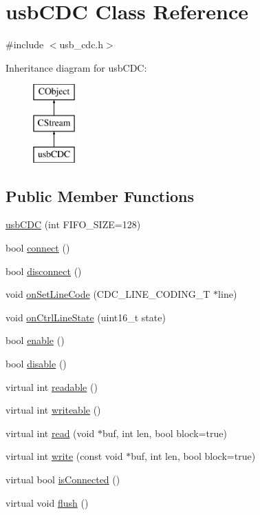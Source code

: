 \hypertarget{classusb_c_d_c}{\section{usb\-C\-D\-C Class Reference}
\label{classusb_c_d_c}
}


{\ttfamily \#include $<$usb\-\_\-cdc.\-h$>$}

Inheritance diagram for usb\-C\-D\-C\-:\begin{figure}[H]
\begin{center}
\leavevmode
\includegraphics[height=3.000000cm]{d6/dc5/classusb_c_d_c}
\end{center}
\end{figure}
\subsection*{Public Member Functions}
\begin{DoxyCompactItemize}
\item 
\hyperlink{classusb_c_d_c_a6eb4d9401ac17bab0bfb869bf6fc6315}{usb\-C\-D\-C} (int F\-I\-F\-O\-\_\-\-S\-I\-Z\-E=128)
\item 
bool \hyperlink{classusb_c_d_c_a49d431de50da7ccacf91ef33b04e99d2}{connect} ()
\item 
bool \hyperlink{classusb_c_d_c_aa95f819926a8da40f12eebc62adf6f95}{disconnect} ()
\item 
void \hyperlink{classusb_c_d_c_a15d235836f03a59a8d3a12ad5df78cd7}{on\-Set\-Line\-Code} (C\-D\-C\-\_\-\-L\-I\-N\-E\-\_\-\-C\-O\-D\-I\-N\-G\-\_\-\-T $\ast$line)
\item 
void \hyperlink{classusb_c_d_c_ad20e467624da633a79b150a435667619}{on\-Ctrl\-Line\-State} (uint16\-\_\-t state)
\item 
bool \hyperlink{classusb_c_d_c_a806fa3a4be9e6cfaab51b8621cb70697}{enable} ()
\item 
bool \hyperlink{classusb_c_d_c_a7ded774547bd49ca5f73257914a1f1f9}{disable} ()
\item 
virtual int \hyperlink{classusb_c_d_c_a7182c4dfdad0293bba73a82056d43e80}{readable} ()
\item 
virtual int \hyperlink{classusb_c_d_c_ae45acb09392fedde912a5dba6fc3b88a}{writeable} ()
\item 
virtual int \hyperlink{classusb_c_d_c_a65831ad4bfa85bf83f467c63b9f22799}{read} (void $\ast$buf, int len, bool block=true)
\item 
virtual int \hyperlink{classusb_c_d_c_a340c728ca722a61a3a457a546a301dec}{write} (const void $\ast$buf, int len, bool block=true)
\item 
virtual bool \hyperlink{classusb_c_d_c_a0c0cb27d108bed8763e68a4121efee32}{is\-Connected} ()
\item 
virtual void \hyperlink{classusb_c_d_c_afebca0ce341d46537cc6e2a811bede72}{flush} ()
\end{DoxyCompactItemize}


